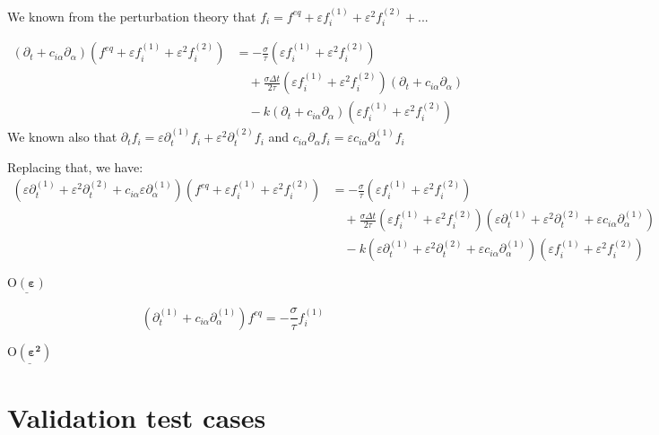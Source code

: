 \documentclass{article}
\newcommand{\Omicron}{\mathrm{O}}
\begin{document}
We known from the perturbation theory that $f_{i} =f^{eq} +\varepsilon f_{i}^{( 1)} +\varepsilon ^{2} f_{i}^{( 2)} +...$

\begin{equation}
    \begin{aligned}
        ( \partial _{t} + c_{i\alpha } \partial _{\alpha })\left( f^{eq} + \varepsilon f_{i}^{( 1)} + \varepsilon ^{2} f_{i}^{( 2)}\right) 
        &= -\frac{\sigma}{\tau }\left( \varepsilon f_{i}^{( 1)} + \varepsilon ^{2} f_{i}^{( 2)}\right) \\
        &\quad + \frac{\sigma \Delta t}{2 \tau }\left( \varepsilon f_{i}^{( 1)} + \varepsilon ^{2} f_{i}^{( 2)}\right)( \partial _{t} + c_{i\alpha } \partial _{\alpha }) \\
        &\quad - k( \partial _{t} + c_{i\alpha } \partial _{\alpha })\left( \varepsilon f_{i}^{( 1)} + \varepsilon ^{2} f_{i}^{( 2)}\right)
    \end{aligned}
\end{equation}
We known also that $\partial _{t} f_{i} = \varepsilon \partial _{t}^{( 1)} f_{i} +\varepsilon ^{2} \partial _{t}^{( 2)} f_{i}$
and $c_{i\alpha } \partial _{\alpha } f_{i} =\varepsilon c_{i\alpha } \partial _{\alpha }^{( 1)} f_{i}$

Replacing that, we have:
\begin{equation}
    \begin{aligned}
        \left( \varepsilon \partial_{t}^{(1)} + \varepsilon^{2} \partial_{t}^{(2)} + c_{i\alpha} \varepsilon \partial_{\alpha}^{(1)} \right) 
        \left( f^{eq} + \varepsilon f_{i}^{(1)} + \varepsilon^{2} f_{i}^{(2)} \right) 
        &= -\frac{\sigma}{\tau} \left( \varepsilon f_{i}^{(1)} + \varepsilon^{2} f_{i}^{(2)} \right) \\
        &\quad + \frac{\sigma \Delta t}{2\tau} \left( \varepsilon f_{i}^{(1)} + \varepsilon^{2} f_{i}^{(2)} \right) 
        \left( \varepsilon \partial_{t}^{(1)} + \varepsilon^{2} \partial_{t}^{(2)} + \varepsilon c_{i\alpha} \partial_{\alpha}^{(1)} \right) \\
        &\quad - k \left( \varepsilon \partial_{t}^{(1)} + \varepsilon^{2} \partial_{t}^{(2)} + \varepsilon c_{i\alpha} \partial_{\alpha}^{(1)} \right) 
        \left( \varepsilon f_{i}^{(1)} + \varepsilon^{2} f_{i}^{(2)} \right)
    \end{aligned}
\end{equation}

$\underline{\boldsymbol{\Omicron ( \varepsilon )}}$

\begin{equation*}
    \left( \partial _{t}^{( 1)} +c_{i\alpha } \partial _{\alpha }^{( 1)}\right) f^{eq} =-\frac{\sigma}{\tau } f_{i}^{( 1)}
\end{equation*}

$\underline{\boldsymbol{\Omicron ( \varepsilon^2 )}}$

\section{Validation test cases}
\end{document}
